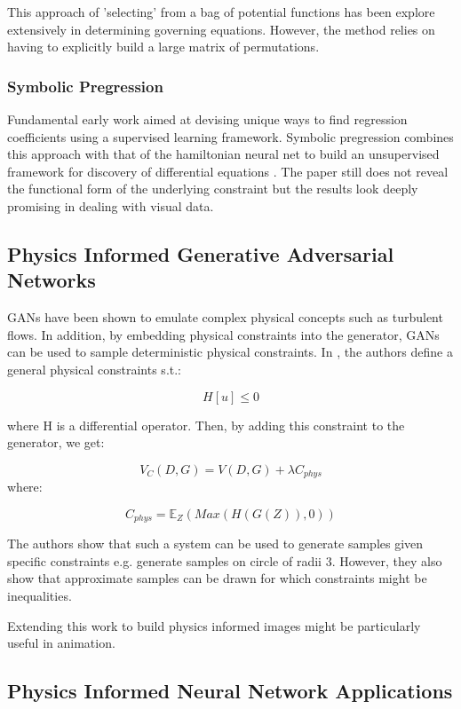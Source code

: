 \documentclass{article}
\begin{document}
 This approach of 'selecting' from a bag of potential functions has been explore extensively in determining governing equations. However, the method relies on having to explicitly build a large matrix of permutations. 

\subsubsection{Symbolic Pregression}

Fundamental early work aimed at devising unique ways to find regression coefficients using a supervised learning framework. Symbolic pregression combines this approach with that of the hamiltonian neural net to build an unsupervised framework for discovery of differential equations \cite{udrescu_symbolic_2020}. The paper still does not reveal the functional form of the underlying constraint but the results look deeply promising in dealing with visual data.

\subsection{Physics Informed Generative Adversarial Networks}

GANs have been shown to emulate complex physical concepts such as turbulent flows. In addition, by embedding physical constraints into the generator, GANs can be used to sample deterministic physical constraints. In \cite{yang_enforcing_2019}, the authors define a general physical constraints s.t.:

$$ H[u] \leq 0$$

where H is a differential operator. Then, by adding this constraint to the generator, we get:

$$V_C(D,G) = V(D,G) + \lambda C_{phys} $$ where:

$$ C_{phys} = \mathbb{E}_{Z} (Max(H(G(Z)),0))$$

The authors show that such a system can be used to generate samples given specific constraints e.g. generate samples on  circle of radii 3. However, they also show that approximate samples can be drawn for which constraints might be inequalities. 

Extending this work to build physics informed images might be particularly useful in animation. 
\subsection{Physics Informed Neural Network Applications}
\end{document}
